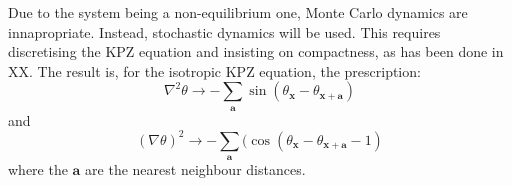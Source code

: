 \documentclass[letterpaper, 10 pt, conference]{IEEEtran}  %
\newcommand{\myvec}[1]{\boldsymbol{#1}}
\begin{document}
Due to the system being a non-equilibrium one, Monte Carlo dynamics are innapropriate.
Instead, stochastic dynamics will be used. 
This requires discretising the KPZ equation and insisting on compactness, as has been done in XX. The result is, for the isotropic KPZ equation, the prescription: 
\[
	\nabla^2 \theta \to - \sum_{\myvec{a}} \sin ( \theta_{\myvec{x}} - \theta_{\myvec{x} + \myvec{a}})
\]
and
\[
(\nabla \theta )^2 \to - \sum_{\myvec{a}} ( \cos ( \theta_{\myvec{x}} - \theta_{\myvec{x} + \myvec{a}} - 1 )
\]
where the $\myvec{a}$ are the nearest neighbour distances.
\printbibliography
\end{document}
